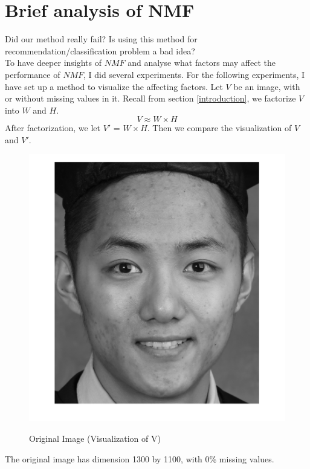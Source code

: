 \documentclass[11pt]{article} %
\begin{document}
\section{Brief analysis of NMF}
Did our method really fail? Is using this method for recommendation/classification problem a bad idea?\\ 
To have deeper insights of $NMF$ and analyse what factors may affect the performance of $NMF$, I did several experiments. For the following experiments, I have set up a method to visualize the affecting factors. Let $V$ be an image, with or without missing values in it. Recall from section \ref{introduction}, we factorize $V$ into $W$ and $H$.
 \begin{equation}\label{eq3}
V\approx W \times H
\end{equation}
After factorization, we let $V'$ = $W \times H$. Then we compare the visualization of $V$ and $V'$.\
\begin{figure}[H] 
\centering
  \begin{minipage}[H]{0.32\linewidth}\label{ m1cv1} 
    \includegraphics[width=\linewidth]{mySelfieOriginal.png} 
    \centering
    \caption{Original Image (Visualization of V)} 
  \end{minipage} 
\end{figure}
The original image has dimension 1300 by 1100, with 0\% missing values.
\end{document}
